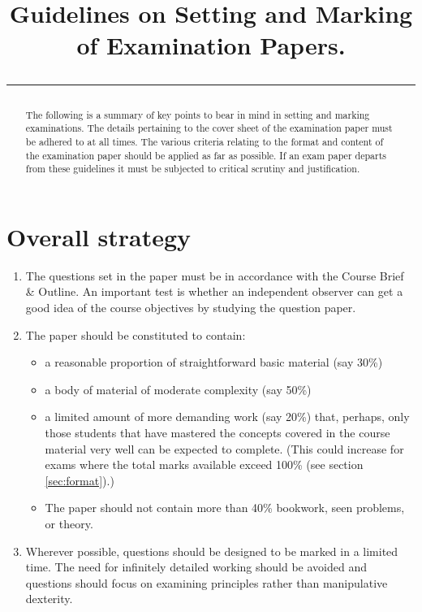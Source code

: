 \documentclass{ArcHandout}
\title{Guidelines on Setting and Marking of Examination
       Papers.\\\vspace*{1em}\hrule}
\begin{document}
\makeheads




\begin{abstract}
The following is a summary of key points to bear in mind in setting
and marking examinations. The details pertaining to the cover sheet of the
examination paper must be adhered to at all times. The various criteria
relating to the format and content of the examination paper should be
applied as far as possible. If an exam paper departs from these guidelines
it must be subjected to critical scrutiny and justification.
\end{abstract}

\section{Overall strategy}
\begin{enumerate}
  \item The questions set in the paper must be in accordance with the
  Course Brief \& Outline. An important test is whether an independent
  observer can get a good idea of the course objectives by studying the
  question paper.

  \item The paper should be constituted to contain:
    \begin{itemize}
      \item a reasonable proportion of straightforward basic material (say
      30\%) 

      \item a body of material of moderate complexity (say 50\%)

      \item a limited amount of more demanding work (say 20\%) that,
      perhaps, only those students that have mastered the concepts covered
      in the course material very well can be expected to complete.  (This
      could increase for exams where the total marks available exceed 100\%
      (see section \ref{sec:format}).)

      \item The paper should not contain more than 40\% bookwork, seen
      problems, or theory.
    \end{itemize}

  \item Wherever possible, questions should be designed to be marked in a
  limited time. The need for infinitely detailed working should be avoided
  and questions should focus on examining principles rather than
  manipulative dexterity.
\end{enumerate}
\end{document}
